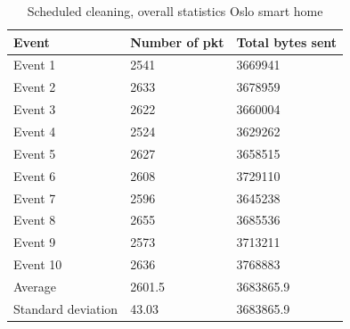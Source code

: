 \begin{table}[H]
\centering
\caption{Scheduled cleaning, overall statistics Oslo smart home}
\label{tab:scoverall}
\begin{tabular}{|l|l|l|}
\hline
\textbf{Event} & \textbf{Number of pkt} & \textbf{Total bytes sent} \\ \hline
Event 1        & 2541                   & 3669941                   \\ \hline
Event 2        & 2633                   & 3678959                   \\ \hline
Event 3        & 2622                   & 3660004                   \\ \hline
Event 4        & 2524                   & 3629262                   \\ \hline
Event 5        & 2627                   & 3658515                   \\ \hline
Event 6        & 2608                   & 3729110                   \\ \hline
Event 7        & 2596                   & 3645238                   \\ \hline
Event 8        & 2655                   & 3685536                   \\ \hline
Event 9        & 2573                   & 3713211                   \\ \hline
Event 10       & 2636                   & 3768883                   \\ \hline
Average        & 2601.5                 & 3683865.9                 \\ \hline
Standard deviation        & 43.03                 & 3683865.9                 \\ \hline
\end{tabular}
\end{table}

